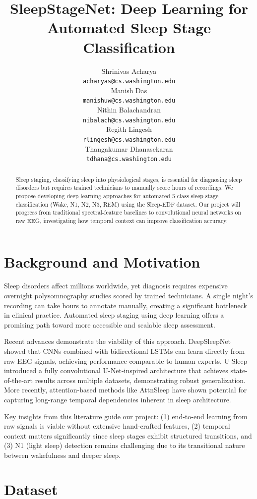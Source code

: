 \documentclass[final]{article}
\title{SleepStageNet: Deep Learning for Automated Sleep Stage Classification}
\author{%
  Shrinivas Acharya \\
  \texttt{acharyas@cs.washington.edu} \\
  \And
  Manish Das \\
  \texttt{manishuw@cs.washington.edu} \\
  \AND
  Nithin Balachandran \\
  \texttt{nibalach@cs.washington.edu} \\
  \And
  Regith Lingesh \\
  \texttt{rlingesh@cs.washington.edu} \\
  \And
  Thangakumar Dhanasekaran \\
  \texttt{tdhana@cs.washington.edu} \\
}
\begin{document}
\maketitle

\begin{abstract}
Sleep staging, classifying sleep into physiological stages, is essential for diagnosing sleep disorders but requires trained technicians to manually score hours of recordings. We propose developing deep learning approaches for automated 5-class sleep stage classification (Wake, N1, N2, N3, REM) using the Sleep-EDF dataset. Our project will progress from traditional spectral-feature baselines to convolutional neural networks on raw EEG, investigating how temporal context can improve classification accuracy.
\end{abstract}

\section{Background and Motivation}

Sleep disorders affect millions worldwide, yet diagnosis requires expensive overnight polysomnography studies scored by trained technicians. A single night's recording can take hours to annotate manually, creating a significant bottleneck in clinical practice. Automated sleep staging using deep learning offers a promising path toward more accessible and scalable sleep assessment.

Recent advances demonstrate the viability of this approach. DeepSleepNet \cite{Supratak2017} showed that CNNs combined with bidirectional LSTMs can learn directly from raw EEG signals, achieving performance comparable to human experts. U-Sleep \cite{Perslev2021} introduced a fully convolutional U-Net-inspired architecture that achieves state-of-the-art results across multiple datasets, demonstrating robust generalization. More recently, attention-based methods like AttnSleep \cite{Eldele2021} have shown potential for capturing long-range temporal dependencies inherent in sleep architecture.

Key insights from this literature guide our project: (1) end-to-end learning from raw signals is viable without extensive hand-crafted features, (2) temporal context matters significantly since sleep stages exhibit structured transitions, and (3) N1 (light sleep) detection remains challenging due to its transitional nature between wakefulness and deeper sleep.

\section{Dataset}
\end{document}
